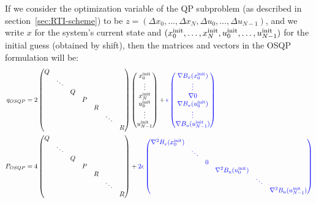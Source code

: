 \documentclass[12pt]{article}
\begin{document}
If we consider the optimization variable of the QP subproblem (as described in section~\ref{sec:RTI-scheme}) to be $z=(\Delta x_0,\ldots,\Delta x_N,\Delta u_0, \ldots,\Delta u_{N-1})$, and we write $x$ for the system's current state and  $(x_0^{\rm{init}},\ldots,x_{N}^{\rm{init}},u_0^{\rm{init}},\ldots,u_{N-1}^{\rm{init}})$ for the initial guess (obtained by shift), then the matrices and vectors in the OSQP formulation will be:
\scriptsize
\begin{align*}
	q_{OSQP}&=2\begin{pmatrix}
		Q&&&&&&\\
		&\ddots&&&&&\\
		&&Q&&&&\\
		&&&P&&&\\
		&&&&R&&\\
		&&&&&\ddots&\\
		&&&&&&R
	\end{pmatrix}\begin{pmatrix}
		x_0^{\rm{init}}\\\vdots\\x_N^{\rm{init}}\\u_0^{\rm{init}}\\\vdots\\u_{N-1}^{\rm{init}}
	\end{pmatrix}+\color{blue}\epsilon\begin{pmatrix}
		\nabla B_x(x_0^{\rm{init}})\\\vdots\\\nabla 0\\\nabla B_u(u_0^{\rm{init}})\\\vdots\\\nabla B_u(u_{N-1}^{\rm{init}})
	\end{pmatrix}\color{black}\\
	P_{OSQP}&=4\begin{pmatrix}
		Q&&&&&&\\
		&\ddots&&&&&\\
		&&Q&&&&\\
		&&&P&&&\\
		&&&&R&&\\
		&&&&&\ddots&\\
		&&&&&&R
	\end{pmatrix}+\color{blue}2\epsilon\begin{pmatrix}
		\nabla^2B_x(x_0^{\rm{init}})&&&&&\\
		&\ddots&&&&\\
		&&0&&&\\
		&&&\nabla^2B_u(u_0^{\rm{init}})&&\\
		&&&&\ddots&\\
		&&&&&\nabla^2B_u(u_{N-1}^{\rm{init}})
	\end{pmatrix}\color{black}
\end{align*}
\end{document}
